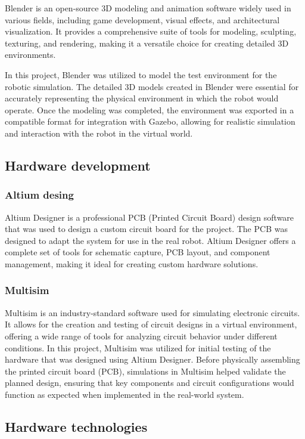 \documentclass[../../monografia.tex]{subfiles}
\begin{document}
Blender is an open-source 3D modeling and animation software widely used in various fields, including game development, visual effects, and architectural visualization. It provides a comprehensive suite of tools for modeling, sculpting, texturing, and rendering, making it a versatile choice for creating detailed 3D environments.

In this project, Blender was utilized to model the test environment for the robotic simulation. The detailed 3D models created in Blender were essential for accurately representing the physical environment in which the robot would operate. Once the modeling was completed, the environment was exported in a compatible format for integration with Gazebo, allowing for realistic simulation and interaction with the robot in the virtual world.

\subsection{Hardware development}
\subsubsection{Altium desing}

Altium Designer is a professional PCB (Printed Circuit Board) design software that was used to design a custom circuit board for the project. The PCB was designed to adapt the system for use in the real robot. Altium Designer offers a complete set of tools for schematic capture, PCB layout, and component management, making it ideal for creating custom hardware solutions.

\subsubsection{Multisim}

Multisim is an industry-standard software used for simulating electronic circuits. It allows for the creation and testing of circuit designs in a virtual environment, offering a wide range of tools for analyzing circuit behavior under different conditions. In this project, Multisim was utilized for initial testing of the hardware that was designed using Altium Designer. Before physically assembling the printed circuit board (PCB), simulations in Multisim helped validate the planned design, ensuring that key components and circuit configurations would function as expected when implemented in the real-world system.

\subsection{Hardware technologies}
\end{document}
